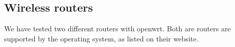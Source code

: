 \subsection{Wireless routers}
We have tested two different routers with openwrt. Both are routers are supported by the operating system, as listed on their website.




